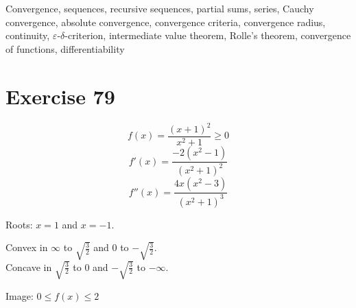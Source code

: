 \documentclass[a4paper]{article}
\theoremstyle{definition}
\begin{document}
Convergence, sequences, recursive sequences, partial sums, series, Cauchy convergence,
absolute convergence, convergence criteria, convergence radius, continuity,
$\varepsilon$-$\delta$-criterion, intermediate value theorem, Rolle's theorem,
convergence of functions, differentiability

\section{Exercise 79}
%
\[ f(x) = \frac{(x+1)^2}{x^2 + 1} \geq 0 \]
\[ f'(x) = \frac{-2(x^2 - 1)}{(x^2 + 1)^2} \]
\[ f''(x) = \frac{4x(x^2 - 3)}{(x^2 + 1)^3} \]

Roots: $x=1$ and $x=-1$.

Convex in $\infty$ to $\sqrt{\frac32}$ and $0$ to $-\sqrt{\frac32}$. \\
Concave in $\sqrt{\frac32}$ to $0$ and $-\sqrt{\frac32}$ to $-\infty$.

Image: $0 \leq f(x) \leq 2$
\end{document}
